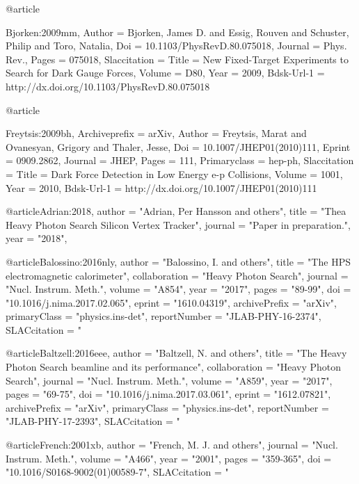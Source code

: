 {{{{{{{{{{{{{{{@article{Bjorken:2009mm,
	Author = {Bjorken, James D. and Essig, Rouven and Schuster, Philip and Toro, Natalia},
	Doi = {10.1103/PhysRevD.80.075018},
	Journal = {Phys. Rev.},
	Pages = {075018},
	Slaccitation = {%
	Title = {{New Fixed-Target Experiments to Search for Dark Gauge Forces}},
	Volume = {D80},
	Year = {2009},
	Bdsk-Url-1 = {http://dx.doi.org/10.1103/PhysRevD.80.075018}
}

@article{Freytsis:2009bh,
	Archiveprefix = {arXiv},
	Author = {Freytsis, Marat and Ovanesyan, Grigory and Thaler, Jesse},
	Doi = {10.1007/JHEP01(2010)111},
	Eprint = {0909.2862},
	Journal = {JHEP},
	Pages = {111},
	Primaryclass = {hep-ph},
	Slaccitation = {%
	Title = {{Dark Force Detection in Low Energy e-p Collisions}},
	Volume = {1001},
	Year = {2010},
	Bdsk-Url-1 = {http://dx.doi.org/10.1007/JHEP01(2010)111}
}

@article{Adrian:2018, 
      author         = "Adrian, Per Hansson and others", 
      title          = "{Thea Heavy Photon Search Silicon Vertex Tracker}",
      journal        = "Paper in preparation.",
      year           = "2018",
}

@article{Balossino:2016nly,
      author         = "Balossino, I. and others",
      title          = "{The HPS electromagnetic calorimeter}",
      collaboration  = "Heavy Photon Search",
      journal        = "Nucl. Instrum. Meth.",
      volume         = "A854",
      year           = "2017",
      pages          = "89-99",
      doi            = "10.1016/j.nima.2017.02.065",
      eprint         = "1610.04319",
      archivePrefix  = "arXiv",
      primaryClass   = "physics.ins-det",
      reportNumber   = "JLAB-PHY-16-2374",
      SLACcitation   = "%
}

@article{Baltzell:2016eee,
      author         = "Baltzell, N. and others",
      title          = "{The Heavy Photon Search beamline and its performance}",
      collaboration  = "Heavy Photon Search",
      journal        = "Nucl. Instrum. Meth.",
      volume         = "A859",
      year           = "2017",
      pages          = "69-75",
      doi            = "10.1016/j.nima.2017.03.061",
      eprint         = "1612.07821",
      archivePrefix  = "arXiv",
      primaryClass   = "physics.ins-det",
      reportNumber   = "JLAB-PHY-17-2393",
      SLACcitation   = "%
}

@article{French:2001xb,
      author         = "French, M. J. and others",
      journal        = "Nucl. Instrum. Meth.",
      volume         = "A466",
      year           = "2001",
      pages          = "359-365",
      doi            = "10.1016/S0168-9002(01)00589-7",
      SLACcitation   = "%
}

}}}}}}}}}}}}}}}}}

